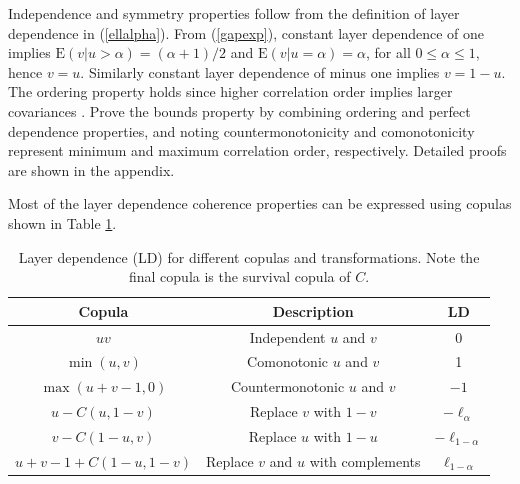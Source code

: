\documentclass[authoryear]{elsarticle}
\newcommand{\E}{{\mathrm E}}
\newcommand{\eref}[1]{(\ref{#1})}
\newcommand{\aref}[1]{\ref{#1}}
\begin{document}
Independence and symmetry properties follow from the definition of layer dependence in \eref{ellalpha}. From \eref{gapexp}, constant layer dependence of one implies $\E(v|u>\alpha)=(\alpha+1)/2$ and $\E(v|u=\alpha)=\alpha$, for all $0\leq\alpha\leq 1$, hence $v=u$. Similarly constant layer dependence of minus one implies $v=1-u$. The ordering property holds since higher correlation order implies larger covariances \citep{dhaene2009correlation}. Prove the bounds property by combining ordering and perfect dependence properties, and noting countermonotonicity and comonotonicity represent minimum and maximum correlation order, respectively. Detailed proofs are shown in the appendix.


Most of the layer dependence coherence properties can be expressed using copulas shown in Table \aref{table1}.

\begin{table}[h]
  \begin{center}
\begin{tabular}{c|c|c }
 Copula & Description & LD \\
 \hline
 $uv$ & Independent $u$ and $v$ & 0 \\
 $\min(u,v)$ & Comonotonic $u$ and $v$ & 1 \\
 $\max(u+v-1,0)$ & Countermonotonic $u$ and $v$ & $-1$\\
 $u-C(u,1-v)$ & Replace $v$ with $1-v$ & $-\ell_\alpha$ \\
 $v-C(1-u,v)$ & Replace $u$ with $1-u$ & $-\ell_{1-\alpha}$ \\
 $u+v-1+C(1-u,1-v)$ & Replace $v$ and $u$ with complements & $\ell_{1-\alpha}$\\
 \hline
\end{tabular}
\caption{Layer dependence (LD) for different copulas and transformations. Note the final copula is the survival copula of $C$.}\label{table1}
  \end{center}
\end{table}
\end{document}
